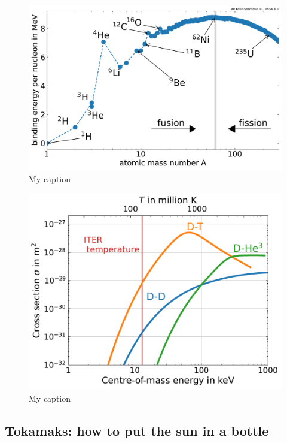 \begin{figure} [h]
    \centering
    \includegraphics[width=\linewidth]{Figures/Chapter1/binding_energy_per_nucleon.pdf}
    \caption{My caption}
\end{figure}


\begin{figure} [h]
    \centering
    \includegraphics[width=\linewidth]{Figures/Chapter1/cross_sections_vs_temperature__Bosch.pdf}
    \caption{My caption}
\end{figure}


\subsection{Tokamaks: how to put the sun in a bottle}


